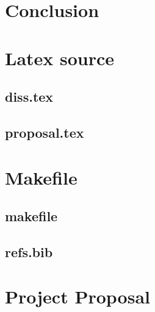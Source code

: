 \documentclass[12pt,a4paper,twoside,openright]{report}
\begin{document}
\chapter{Conclusion}





\appendix

\chapter{Latex source}

\section{diss.tex}
{\scriptsize}

\section{proposal.tex}
{\scriptsize}

\chapter{Makefile}

\section{makefile}\label{makefile}
{\scriptsize}

\section{refs.bib}
{\scriptsize}


\chapter{Project Proposal}


\end{document}
